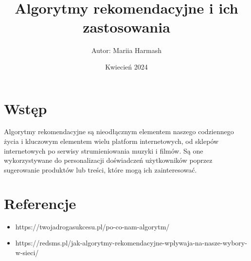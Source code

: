 \documentclass{article}
\title{Algorytmy rekomendacyjne i ich zastosowania}
\author{Autor: Mariia Harmash}
\date{Kwiecień 2024}
\begin{document}
\maketitle
\newpage

\section{Wstęp}

Algorytmy rekomendacyjne są nieodłącznym elementem naszego codziennego życia i kluczowym elementem wielu platform internetowych,
od sklepów internetowych po serwisy strumieniowania muzyki i filmów. Są one wykorzystywane do personalizacji doświadczeń użytkowników
poprzez sugerowanie produktów lub treści, które mogą ich zainteresować.

\section{Referencje}
\begin{itemize}
    \item https://twojadrogasukcesu.pl/po-co-nam-algorytm/
    \item https://redsms.pl/jak-algorytmy-rekomendacyjne-wplywaja-na-nasze-wybory-w-sieci/
    
\end{itemize}
\end{document}

